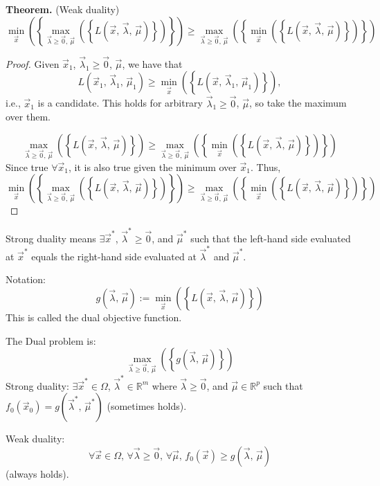 \documentclass{article}
\newcommand{\R}{\mathbb{R}}             %
\newcommand{\x}{\vec{x}}                %
\newcommand{\rl}[1]{\left(#1\right)}
\begin{document}
\textbf{Theorem.} (Weak duality)
\[
    \min_{\x}\rl{\left\{\max_{\vec{\lambda} \geq \vec{0},\, \vec{\mu}}\rl{\left\{L\rl{\x,\, \vec{\lambda},\, \vec{\mu}}\right\}}\right\}} \geq \max_{\vec{\lambda} \geq \vec{0},\, \vec{\mu}}\rl{\left\{\min_{\x}\rl{\left\{L\rl{\x,\, \vec{\lambda},\, \vec{\mu}}\right\}}\right\}}
\]

\begin{proof}
    Given $\x_1$, $\vec{\lambda}_1 \geq \vec{0}$, $\vec{\mu}$, we have that
    \[
        L\rl{\x_1,\, \vec{\lambda}_1,\, \vec{\mu}_1} \geq \min_{\x}\rl{\left\{L\rl{\x,\, \vec{\lambda}_1,\, \vec{\mu}_1}\right\}},
    \]
    i.e., $\x_1$ is a candidate. This holds for arbitrary $\vec{\lambda}_1 \geq \vec{0}$, $\vec{\mu}$, so take the maximum over them.

    \[
        \max_{\vec{\lambda} \geq \vec{0},\, \vec{\mu}}\rl{\left\{L\rl{\x,\, \vec{\lambda},\, \vec{\mu}}\right\}} \geq \max_{\vec{\lambda} \geq \vec{0},\, \vec{\mu}}\rl{\left\{\min_{\x}\rl{\left\{L\rl{\x,\, \vec{\lambda},\, \vec{\mu}}\right\}}\right\}}
    \]
    Since true $\forall \x_1$, it is also true given the minimum over $\x_1$. Thus,
    \[
        \min_{\x}\rl{\left\{\max_{\vec{\lambda} \geq \vec{0},\, \vec{\mu}}\rl{\left\{L\rl{\x,\, \vec{\lambda},\, \vec{\mu}}\right\}}\right\}} \geq \max_{\vec{\lambda} \geq \vec{0},\, \vec{\mu}}\rl{\left\{\min_{\x}\rl{\left\{L\rl{\x,\, \vec{\lambda},\, \vec{\mu}}\right\}}\right\}}
    \]
\end{proof}

Strong duality means $\exists \x^*$, $\vec{\lambda}^* \geq \vec{0}$, and $\vec{\mu}^*$ such that the left-hand side evaluated at $\x^*$ equals the right-hand side evaluated at $\vec{\lambda}^*$ and $\vec{\mu}^*$.

Notation:
\[
    g(\vec{\lambda},\, \vec{\mu}) := \min_{\x}\rl{\left\{L\rl{\x,\, \vec{\lambda},\, \vec{\mu}}\right\}}
\]
This is called the dual objective function.

The Dual problem is:
\[
    \max_{\vec{\lambda} \geq \vec{0},\, \vec{\mu}} \rl{\left\{g(\vec{\lambda},\, \vec{\mu})\right\}}
\]
Strong duality: $\exists \x^* \in \Omega$, $\vec{\lambda}^* \in \R^m$ where $\vec{\lambda} \geq \vec{0}$, and $\vec{\mu} \in \R^p$ such that $f_0\rl{\x_0} = g\rl{\vec{\lambda}^*,\, \vec{\mu}^*}$ (sometimes holds).

Weak duality:
\[
    \forall \x \in \Omega,\, \forall \vec{\lambda} \geq \vec{0},\, \forall \vec{\mu},\, f_0\rl{\x} \geq g\rl{\vec{\lambda},\, \vec{\mu}}
\]
(always holds).
\end{document}
